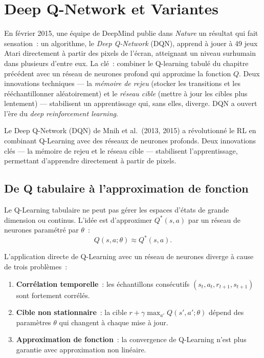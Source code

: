 \chapter{Deep Q-Network et Variantes}
\label{ch:dqn}

En f\'evrier 2015, une \'equipe de DeepMind publie dans \emph{Nature} un r\'esultat qui fait sensation~: un algorithme, le \emph{Deep Q-Network} (DQN), apprend \`a jouer \`a 49 jeux Atari directement \`a partir des pixels de l'\'ecran, atteignant un niveau surhumain dans plusieurs d'entre eux. La cl\'e~: combiner le Q-learning tabul\'e du chapitre pr\'ec\'edent avec un r\'eseau de neurones profond qui approxime la fonction $Q$. Deux innovations techniques --- la \emph{m\'emoire de rejeu} (stocker les transitions et les r\'e\'echantillonner al\'eatoirement) et le \emph{r\'eseau cible} (mettre \`a jour les cibles plus lentement) --- stabilisent un apprentissage qui, sans elles, diverge. DQN a ouvert l'\`ere du \emph{deep reinforcement learning}.

\begin{intuition}
Le Deep Q-Network (DQN) de Mnih et al.\ (2013, 2015) a r\'evolutionn\'e le RL en
combinant Q-Learning avec des r\'eseaux de neurones profonds. Deux innovations
cl\'es --- la m\'emoire de rejeu et le r\'eseau cible --- stabilisent l'apprentissage,
permettant d'apprendre directement \`a partir de pixels.
\end{intuition}

\section{De Q tabulaire \`a l'approximation de fonction}

Le Q-Learning tabulaire ne peut pas g\'erer les espaces d'\'etats de grande
dimension ou continus. L'id\'ee est d'approximer $Q^*(s,a)$ par un r\'eseau
de neurones param\'etr\'e par $\theta$~:
\[
    Q(s, a; \theta) \approx Q^*(s, a).
\]

\begin{attention}[title=\textbf{Instabilit\'e na\"ive}]
L'application directe de Q-Learning avec un r\'eseau de neurones diverge
\`a cause de trois probl\`emes~:
\begin{enumerate}
    \item \textbf{Corr\'elation temporelle}~: les \'echantillons cons\'ecutifs
    $(s_t, a_t, r_{t+1}, s_{t+1})$ sont fortement corr\'el\'es.
    \item \textbf{Cible non stationnaire}~: la cible $r + \gamma \max_{a'} Q(s', a'; \theta)$
    d\'epend des param\`etres $\theta$ qui changent \`a chaque mise \`a jour.
    \item \textbf{Approximation de fonction}~: la convergence de Q-Learning
    n'est plus garantie avec approximation non lin\'eaire.
\end{enumerate}
\end{attention}

